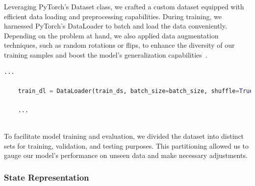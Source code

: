 Leveraging PyTorch's Dataset class, we crafted a custom dataset equipped with efficient data loading and preprocessing capabilities. 
During training, we harnessed PyTorch's DataLoader to batch and load the data conveniently. 
Depending on the problem at hand, we also applied data augmentation techniques, such as random rotations or flips, 
to enhance the diversity of our training samples and boost the model's generalization capabilities~\cite{Onl:dataAug}.

\begin{lstlisting}[language=Python]
    ...

    train_dl = DataLoader(train_ds, batch_size=batch_size, shuffle=True)

    ...
    
\end{lstlisting}

To facilitate model training and evaluation, we divided the dataset into distinct sets for training, validation, 
and testing purposes. This partitioning allowed us to gauge our model's performance on unseen data and make necessary adjustments.

\subsubsection*{State Representation}

